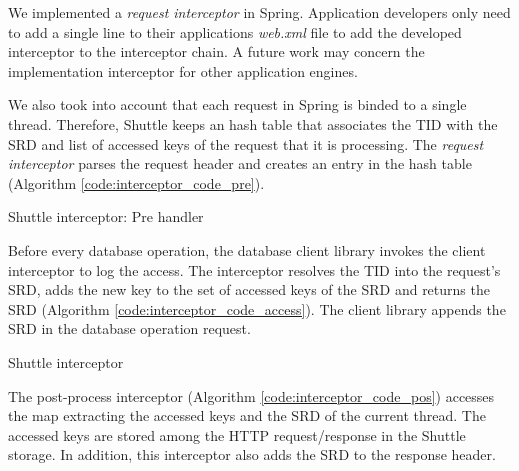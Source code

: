 We implemented a \emph{request interceptor} in Spring. Application developers only need to add a single line to their applications \emph{web.xml} file to add the developed interceptor to the interceptor chain. A future work may concern the implementation interceptor for other application engines.

We also took into account that each request in Spring is binded to a single thread. Therefore, Shuttle keeps an hash table that associates the \ac{TID} with the \ac{SRD} and list of accessed keys of the request that it is processing. The \emph{request interceptor} parses the request header and creates an entry in the hash table (Algorithm \ref{code:interceptor_code_pre}).


\begin{algorithm}
\DontPrintSemicolon{}

	\BlankLine
	\caption{Shuttle interceptor: Pre handler}
	\label{code:interceptor_code_pre}
\end{algorithm}

Before every database operation, the database client library invokes the client interceptor to log the access. The interceptor resolves the \ac{TID} into the request's \ac{SRD}, adds the new key to the set of accessed keys of the \ac{SRD} and returns the \ac{SRD} (Algorithm \ref{code:interceptor_code_access}). The client library appends the \ac{SRD} in the database operation request. 


\begin{algorithm}
\DontPrintSemicolon{}
	
\caption{Shuttle interceptor}
\label{code:interceptor_code_access}
\end{algorithm}

The post-process interceptor (Algorithm \ref{code:interceptor_code_pos}) accesses the map extracting the accessed keys and the \ac{SRD} of the current thread. The accessed keys are stored among the \ac{HTTP} request/response in the Shuttle storage. In addition, this interceptor also adds the \ac{SRD} to the response header.

